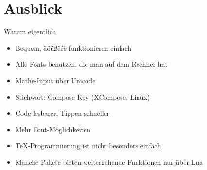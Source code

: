 \section{Ausblick}

\begin{frame}
  \centering
\end{frame}

\begin{frame}[fragile]{Warum eigentlich \LuaTeX}
  \linespread{1.5}
  \begin{description}
    \item[Unicode-Input]
      \begin{itemize}
        \item Bequem, äöüßêéè funktionieren einfach
      \end{itemize}
    \item[OTF-Fonts]
      \begin{itemize}
        \item Alle Fonts benutzen, die man auf dem Rechner hat
      \end{itemize}
    \item[Unicode-Math]
      \begin{itemize}
        \item Mathe-Input über Unicode
        \item Stichwort: Compose-Key (XCompose, Linux)
        \item Code lesbarer, Tippen schneller
        \item Mehr Font-Möglichkeiten
      \end{itemize}
    \item[Lua-Programmierung]
      \begin{itemize}
        \item \TeX-Programmierung ist nicht besonders einfach
        \item Manche Pakete bieten weitergehende Funktionen nur über Lua
      \end{itemize}
  \end{description}
\end{frame}

